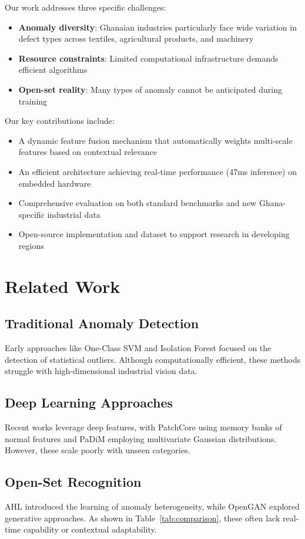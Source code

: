 \documentclass[conference]{IEEEtran}
\begin{document}
Our work addresses three specific challenges:
\begin{itemize}
\item \textbf{Anomaly diversity}: Ghanaian industries particularly face wide variation in defect types across textiles, agricultural products, and machinery
\item \textbf{Resource constraints}: Limited computational infrastructure demands efficient algorithms
\item \textbf{Open-set reality}: Many types of anomaly cannot be anticipated during training
\end{itemize}

Our key contributions include:
\begin{itemize}
\item A dynamic feature fusion mechanism that automatically weights multi-scale features based on contextual relevance
\item An efficient architecture achieving real-time performance (47ms inference) on embedded hardware
\item Comprehensive evaluation on both standard benchmarks and new Ghana-specific industrial data
\item Open-source implementation and dataset to support research in developing regions
\end{itemize}

\section{Related Work}
\subsection{Traditional Anomaly Detection}
Early approaches like One-Class SVM \cite{scholkopf2001estimating} and Isolation Forest \cite{liu2008isolation} focused on the detection of statistical outliers. Although computationally efficient, these methods struggle with high-dimensional industrial vision data.

\subsection{Deep Learning Approaches}
Recent works leverage deep features, with PatchCore \cite{roth2022towards} using memory banks of normal features and PaDiM \cite{defard2021padim} employing multivariate Gaussian distributions. However, these scale poorly with unseen categories.

\subsection{Open-Set Recognition}
AHL \cite{wang2024anomaly} introduced the learning of anomaly heterogeneity, while OpenGAN \cite{kong2020open} explored generative approaches. As shown in Table~\ref{tab:comparison}, these often lack real-time capability or contextual adaptability.
\end{document}

